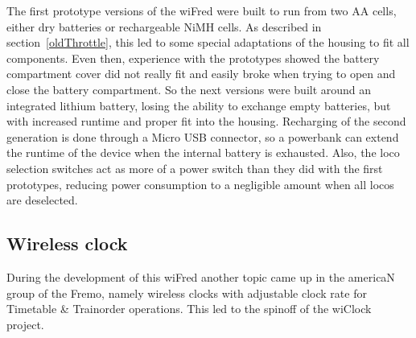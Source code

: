 \documentclass[11pt,a4paper]{scrartcl}
\begin{document}
The first prototype versions of the wiFred were built to run from two AA cells, either dry batteries or rechargeable NiMH cells. As described in section~\ref{oldThrottle}, this led to some special adaptations of the housing to fit all components. Even then, experience with the prototypes showed the battery compartment cover did not really fit and easily broke when trying to open and close the battery compartment. So the next versions were built around an integrated lithium battery, losing the ability to exchange empty batteries, but with increased runtime and proper fit into the housing. Recharging of the second generation is done through a Micro USB connector, so a powerbank can extend the runtime of the device when the internal battery is exhausted. Also, the loco selection switches act as more of a power switch than they did with the first prototypes, reducing power consumption to a negligible amount when all locos are deselected.

\subsection{Wireless clock}

During the development of this wiFred another topic came up in the americaN group of the Fremo, namely wireless clocks with adjustable clock rate for Timetable \& Trainorder operations. This led to the spinoff of the wiClock project\cite{wiClock}.

\clearpage

\begin{thebibliography}{99}
\end{thebibliography}

\begin{versionhistory}
\end{versionhistory}
\end{document}
